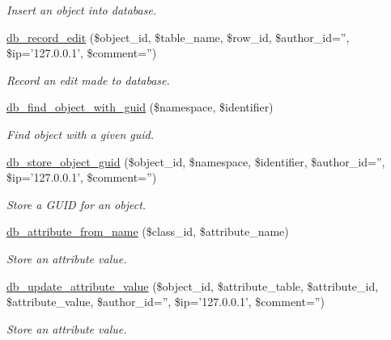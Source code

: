 \begin{CompactItemize}
\begin{CompactList}\small\item\em Insert an object into database. \item\end{CompactList}\item 
\hyperlink{eav_8php_1749f5ed26505143b2f675c5f907c4e7}{db\_\-record\_\-edit} (\$object\_\-id, \$table\_\-name, \$row\_\-id, \$author\_\-id='', \$ip='127.0.0.1', \$comment='')
\begin{CompactList}\small\item\em Record an edit made to database. \item\end{CompactList}\item 
\hyperlink{eav_8php_20e4c8a08082ea43f55c778b615d2671}{db\_\-find\_\-object\_\-with\_\-guid} (\$namespace, \$identifier)
\begin{CompactList}\small\item\em Find object with a given guid. \item\end{CompactList}\item 
\hypertarget{eav_8php_0deac333c4e55bdd1a5074a534eae042}{
\hyperlink{eav_8php_0deac333c4e55bdd1a5074a534eae042}{db\_\-store\_\-object\_\-guid} (\$object\_\-id, \$namespace, \$identifier, \$author\_\-id='', \$ip='127.0.0.1', \$comment='')}
\label{eav_8php_0deac333c4e55bdd1a5074a534eae042}

\begin{CompactList}\small\item\em Store a GUID for an object. \item\end{CompactList}\item 
\hyperlink{eav_8php_ddedeb138f0241eedf67dc5e4793ed24}{db\_\-attribute\_\-from\_\-name} (\$class\_\-id, \$attribute\_\-name)
\begin{CompactList}\small\item\em Store an attribute value. \item\end{CompactList}\item 
\hyperlink{eav_8php_ff4248e5adeb0c01d74689bb6f709691}{db\_\-update\_\-attribute\_\-value} (\$object\_\-id, \$attribute\_\-table, \$attribute\_\-id, \$attribute\_\-value, \$author\_\-id='', \$ip='127.0.0.1', \$comment='')
\begin{CompactList}\small\item\em Store an attribute value. \item\end{CompactList}\end{CompactItemize}


